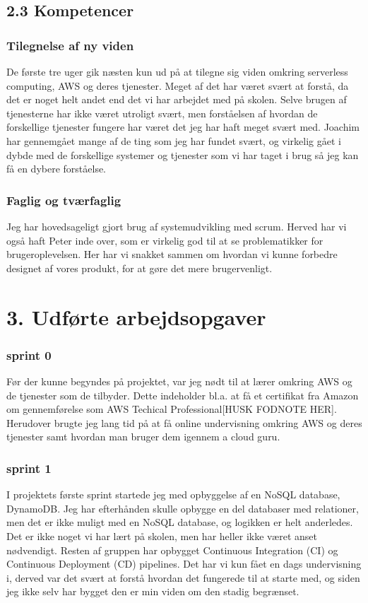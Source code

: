 \documentclass[11pt]{report}
\begin{document}
\section*{2.3 Kompetencer}

\subsection*{Tilegnelse af ny viden}
De første tre uger gik næsten kun ud på at tilegne sig viden omkring serverless computing, 
AWS og deres tjenester. Meget af det har været svært at forstå, da det er noget helt andet 
end det vi har arbejdet med på skolen. Selve brugen af tjenesterne har ikke været utroligt svært, 
men forståelsen af hvordan de forskellige tjenester fungere har været det jeg har haft meget svært med. 
Joachim har gennemgået mange af de ting som jeg har fundet svært, og virkelig gået i dybde med de forskellige 
systemer og tjenester som vi har taget i brug så jeg kan få en dybere forståelse. 

\subsection*{Faglig og tværfaglig}
Jeg har hovedsageligt gjort brug af systemudvikling med scrum. Herved har vi også haft Peter inde over, 
som er virkelig god til at se problematikker for brugeroplevelsen. Her har vi snakket sammen om hvordan 
vi kunne forbedre designet af vores produkt, for at gøre det mere brugervenligt. 

\chapter*{3. Udførte arbejdsopgaver}
\subsection*{sprint 0}
Før der kunne begyndes på projektet, var jeg nødt til at lærer omkring AWS og de tjenester som de tilbyder. 
Dette indeholder bl.a. at få et certifikat fra Amazon om gennemførelse som AWS Techical Professional[HUSK FODNOTE HER]. 
Herudover brugte jeg lang tid på at få online undervisning omkring AWS og deres tjenester samt hvordan man bruger 
dem igennem a cloud guru.

\subsection*{sprint 1}
I projektets første sprint startede jeg med opbyggelse af en NoSQL database, DynamoDB. 
Jeg har efterhånden skulle opbygge en del databaser med relationer, men det er ikke muligt med en NoSQL 
database, og logikken er helt anderledes. Det er ikke noget vi har lært på skolen, men har heller ikke været 
anset nødvendigt. Resten af gruppen har opbygget Continuous Integration (CI) og Continuous Deployment (CD) pipelines. 
Det har vi kun fået en dags undervisning i, derved var det svært at forstå hvordan det fungerede til at starte med, 
og siden jeg ikke selv har bygget den er min viden om den stadig begrænset. 
\end{document}
